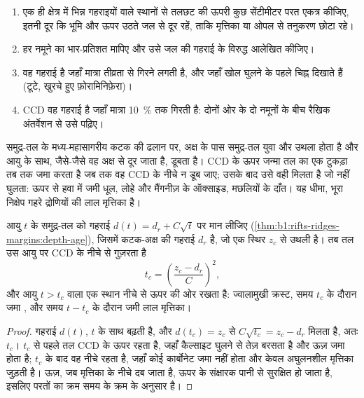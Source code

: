 \begin{method}[लाइसोक्लाइन और CCD का पता लगाना]\label{met:b1:chemical-biogenic-sediments:ccd}
\begin{enumerate}
  \item एक ही क्षेत्र में भिन्न गहराइयों वाले स्थानों से तलछट की ऊपरी कुछ सेंटीमीटर परत एकत्र कीजिए, इतनी दूर कि भूमि और ऊपर उठते जल से दूर रहें, ताकि मृत्तिका या ओपल से तनुकरण छोटा रहे।
  \item हर नमूने का  भार-प्रतिशत मापिए और उसे जल की गहराई के विरुद्ध आलेखित कीजिए।
  \item {} वह गहराई है जहाँ मात्रा तीव्रता से गिरने लगती है, और जहाँ खोल घुलने के पहले चिह्न दिखाते हैं (टूटे, खुरचे हुए फ़ोरामिनिफ़ेरा)।
  \item CCD वह गहराई है जहाँ मात्रा \qty{10}{\%} तक गिरती है: दोनों ओर के दो नमूनों के बीच रैखिक अंतर्वेशन से उसे पढ़िए।
\end{enumerate}
\end{method}

समुद्र-तल के मध्य-महासागरीय कटक की ढलान पर, अक्ष के पास समुद्र-तल युवा और उथला होता है और आयु के साथ, जैसे-जैसे वह अक्ष से दूर जाता है, डूबता है। CCD के ऊपर जन्मा तल का एक टुकड़ा तब तक  जमा करता है जब तक वह CCD के नीचे न डूब जाए; उसके बाद उसे वही मिलता है जो नहीं घुलता: ऊपर से हवा में जमी धूल, लोहे और मैंगनीज़ के ऑक्साइड, मछलियों के दाँत। यह धीमा, भूरा निक्षेप गहरे द्रोणियों की लाल मृत्तिका है।

\begin{proposition}\label{prop:b1:chemical-biogenic-sediments:flank}
आयु $t$ के समुद्र-तल को गहराई $d(t) = d_r + C\sqrt t$ पर मान लीजिए
(\cref{thm:b1:rifts-ridges-margins:depth-age}), जिसमें कटक-अक्ष की गहराई $d_r$ है, जो एक स्थिर  $z_c$ से उथली है। तब तल उस आयु पर CCD के नीचे से गुज़रता है
\[
t_c = \left(\frac{z_c - d_r}{C}\right)^2 ,
\]
और आयु $t > t_c$ वाला एक स्थान नीचे से ऊपर की ओर रखता है: ज्वालामुखी क्रस्ट, समय $t_c$ के दौरान जमा , और समय $t - t_c$ के दौरान जमी लाल मृत्तिका।
\end{proposition}

\begin{proof}
गहराई $d(t)$, $t$ के साथ बढ़ती है, और $d(t_c) = z_c$ से $C\sqrt{t_c} =
z_c - d_r$ मिलता है, अतः $t_c$। $t_c$ से पहले तल CCD के ऊपर रहता है, जहाँ कैल्साइट घुलने से तेज़ बरसता है और ऊज़ जमा होता है; $t_c$ के बाद वह नीचे रहता है, जहाँ कोई कार्बोनेट जमा नहीं होता और केवल अघुलनशील मृत्तिका जुड़ती है। ऊज़, जब मृत्तिका के नीचे दब जाता है, ऊपर के संक्षारक पानी से सुरक्षित हो जाता है, इसलिए परतों का क्रम समय के क्रम के अनुसार है।
\end{proof}


